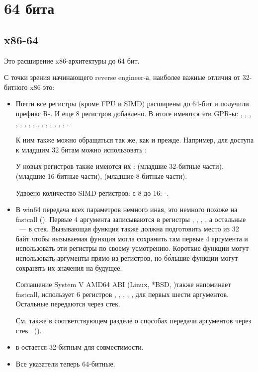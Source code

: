 \section{64 бита}

\subsection{x86-64}
\label{x86-64}

Это расширение x86-архитектуры до 64 бит.

С точки зрения начинающего reverse engineer-а, наиболее важные отличия от 32-битного x86 это:

\myindex{\CLanguageElements!\Pointers}
\begin{itemize}

\item
Почти все регистры (кроме FPU и SIMD) расширены до 64-бит и получили префикс R-. 
И еще 8 регистров добавлено. 
В итоге имеются эти \ac{GPR}-ы:
 \RAX, \RBX, \RCX, \RDX, 
\RBP, \RSP, \RSI, \RDI, , , , 
, , , , . 

К ним также можно обращаться так же, как и прежде. Например, для доступа к младшим 32 битам \RAX 
можно использовать \EAX:


У новых регистров  также имеются их :  
(младшие 32-битные части), 
 (младшие 16-битные части),  (младшие 8-битные части).


Удвоено количество SIMD-регистров: с 8 до 16: -.

\item
В win64 передача всех параметров немного иная, это немного похоже на fastcall 
().
Первые 4 аргумента записываются в регистры \RCX, \RDX, , , а остальные ~--- в стек. 
Вызывающая функция также должна подготовить место из 32 байт чтобы вызываемая функция могла сохранить 
там первые 4 аргумента и использовать эти регистры по своему усмотрению. 
Короткие функции могут использовать аргументы прямо из регистров, но б\'{о}льшие функции могут сохранять 
их значения на будущее.

Соглашение System V AMD64 ABI (Linux, *BSD, \MacOSX)\SysVABI также напоминает
fastcall, использует 6 регистров 
\RDI, \RSI, \RDX, \RCX, ,  для первых шести аргументов.
Остальные передаются через стек.

См. также в соответствующем разделе о способах передачи аргументов через стек ~().

\item
\Tint в \CCpp остается 32-битным для совместимости.

\item
Все указатели теперь 64-битные.

\end{itemize}

